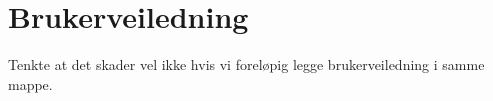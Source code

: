 \chapter{Brukerveiledning}
Tenkte at det skader vel ikke hvis vi foreløpig legge brukerveiledning i samme mappe. 
